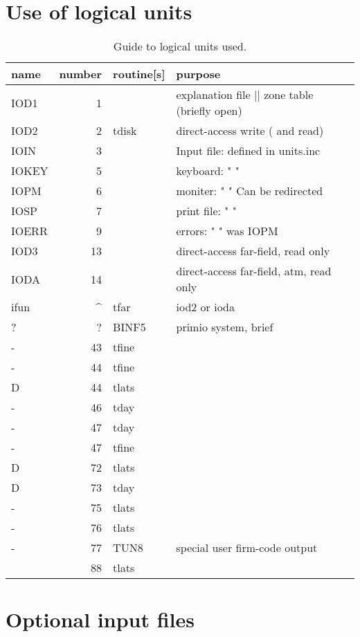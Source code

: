 \documentclass{article}
\begin{document}
\section{Use of logical units} %

\begin{table} 
\caption[Logical units]{Guide to logical units used. }
\label{lunit.tab}
\begin{center} \begin{tabular}{ | l r l l | } \hline
name  & number &  routine[s] &  purpose \\ \hline
IOD1  & 1    &       & explanation file ||  zone table (briefly open) \\
IOD2  & 2    & tdisk & direct-access write ( and read) \\
IOIN  & 3    &       & Input file: defined in units.inc \\
IOKEY & 5    &       & keyboard:     " " \\ 
IOPM  & 6    &       & moniter:      " " Can be redirected \\
IOSP  & 7    &       & print file:   " " \\
IOERR & 9    &       & errors:       " " was IOPM \\
IOD3  & 13   &       & direct-access far-field, read only \\
IODA  & 14   &       & direct-access far-field, atm, read only \\
ifun & \^{ } &  tfar & iod2 or ioda  \\
? &  ? & BINF5 &  primio system, brief \\
- & 43 & tfine & \\
- & 44 & tfine & \\
D & 44 & tlats & \\
- & 46 & tday  & \\
- & 47 & tday  & \\
- & 47 & tfine & \\
D & 72 & tlats & \\
D & 73 & tday  & \\
- & 75 & tlats & \\
- & 76 & tlats & \\
- & 77 & TUN8  & special user firm-code output \\
  & 88 & tlats & \\  \hline
\end{tabular} \end{center} \end{table}

\section{Optional input files} %
\end{document}
